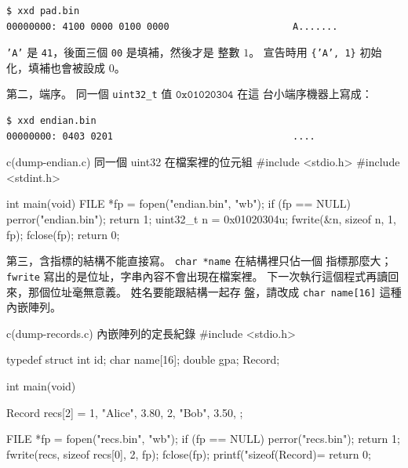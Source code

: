 
\begin{center}
\begin{verbatim}
$ xxd pad.bin
00000000: 4100 0000 0100 0000                      A.......
\end{verbatim}
\end{center}

\texttt{'A'} 是 \texttt{41}，後面三個 \texttt{00} 是填補，然後才是
整數 $1$。 宣告時用 \texttt{\{'A', 1\}} 初始化，填補也會被設成 $0$。

第二，端序。 同一個 \texttt{uint32\_t} 值 $\mathtt{0x01020304}$ 在這
台小端序機器上寫成：

\begin{center}
\begin{verbatim}
$ xxd endian.bin
00000000: 0403 0201                                ....
\end{verbatim}
\end{center}

\begin{example}{c}{(dump-endian.c) 同一個 uint32 在檔案裡的位元組}
#include <stdio.h>
#include <stdint.h>

int main(void) {
    FILE *fp = fopen("endian.bin", "wb");
    if (fp == NULL) {
        perror("endian.bin");
        return 1;
    }
    uint32_t n = 0x01020304u;
    fwrite(&n, sizeof n, 1, fp);
    fclose(fp);
    return 0;
}
\end{example}

第三，含指標的結構不能直接寫。 \texttt{char *name} 在結構裡只佔一個
指標那麼大；\texttt{fwrite} 寫出的是位址，字串內容不會出現在檔案裡。
下一次執行這個程式再讀回來，那個位址毫無意義。 姓名要能跟結構一起存
盤，請改成 \texttt{char name[16]} 這種內嵌陣列。

\begin{example}[label=ex:fio-recs]{c}{(dump-records.c) 內嵌陣列的定長紀錄}
#include <stdio.h>

typedef struct {
    int id;
    char name[16];
    double gpa;
} Record;

int main(void) {
    Record recs[2] = {
        {1, "Alice", 3.80},
        {2, "Bob", 3.50},
    };

    FILE *fp = fopen("recs.bin", "wb");
    if (fp == NULL) {
        perror("recs.bin");
        return 1;
    }
    fwrite(recs, sizeof recs[0], 2, fp);
    fclose(fp);
    printf("sizeof(Record)=%
    return 0;
}
\end{example}

